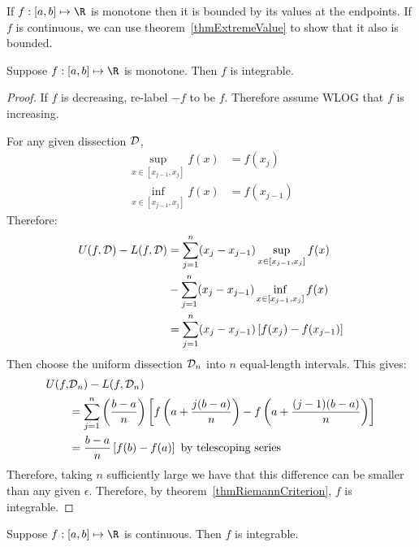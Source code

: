 \documentclass[../Main.tex]{subfiles}
\begin{document}
\begin{remark}
    If $f : [a, b] \mapsto \R$ is monotone then it is bounded by its values at the endpoints. If $f$ is continuous, we can use theorem~\ref{thmExtremeValue} to show that it also is bounded.
\end{remark}
\begin{theorem}
    Suppose $f : [a, b] \mapsto \R$ is monotone. Then $f$ is integrable.
\end{theorem}
\begin{proof}
    If $f$ is decreasing, re-label $-f$ to be $f$. Therefore assume WLOG that $f$ is increasing.
    
    For any given dissection $\mathcal{D}$,
    \begin{align*}
        \sup_{x \in [x_{j-1}, x_j]} f(x) &= f(x_j) \\
        \inf_{x \in [x_{j-1}, x_j]} f(x) &= f(x_{j-1}) 
    \end{align*}
    Therefore:
    \begin{align*}
        U(f, \mathcal{D}) - L(f, \mathcal{D}) &= \sum_{j = 1}^n (x_j - x_{j - 1}) \sup_{x \in [x_{j-1}, x_j]} f(x) \\
        &- \sum_{j = 1}^n (x_j - x_{j - 1}) \inf_{x \in [x_{j-1}, x_j]} f(x) \\
        &= \sum_{j = 1}^n (x_j - x_{j - 1}) \left[f(x_j) - f(x_{j - 1})\right]
    \end{align*}
    Then choose the uniform dissection $\mathcal{D}_n$ into $n$ equal-length intervals. This gives:
    \begin{align*}
        U(f, &\mathcal{D}_n) - L(f, \mathcal{D}_n) \\
        &= \sum_{j = 1}^n \left(\frac{b - a}{n}\right) \left[f\left(a + \frac{j(b - a)}{n}\right) - f\left(a + \frac{(j - 1)(b - a)}{n}\right)\right] \\
        &= \frac{b - a}{n} \left[f(b) - f(a)\right] \text{ by telescoping series}
    \end{align*}
    Therefore, taking $n$ sufficiently large we have that this difference can be smaller than any given $\epsilon$. Therefore, by theorem~\ref{thmRiemannCriterion}, $f$ is integrable.
\end{proof}
\begin{theorem}
    Suppose $f : [a, b] \mapsto \R$ is continuous. Then $f$ is integrable.
\end{theorem}
\end{document}
